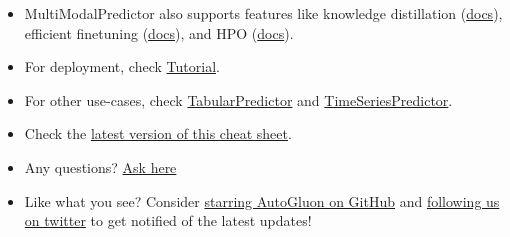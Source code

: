 \begin{itemize}
  \item MultiModalPredictor also supports features like knowledge distillation (\href{https://auto.gluon.ai/stable/tutorials/multimodal/advanced_topics/model_distillation.html}{docs}), efficient finetuning (\href{https://auto.gluon.ai/stable/tutorials/multimodal/advanced_topics/efficient_finetuning_basic.html}{docs}), and HPO (\href{https://auto.gluon.ai/stable/tutorials/multimodal/advanced_topics/hyperparameter_optimization.html}{docs}).
  \item For deployment, check \href{https://auto.gluon.ai/stable/tutorials/cloud_fit_deploy/index.html}{Tutorial}.
  \item For other use-cases, check
  \href{https://auto.gluon.ai/stable/tutorials/tabular_prediction/index.html}{TabularPredictor} and
  \href{https://auto.gluon.ai/stable/tutorials/timeseries/index.html}{TimeSeriesPredictor}.
  \item Check the \href{https://auto.gluon.ai/stable/cheatsheet.html}{latest version of this cheat sheet}.
  \item Any questions? \href{https://github.com/awslabs/autogluon/discussions}{Ask here}
  \item Like what you see? Consider \href{https://github.com/awslabs/autogluon/stargazers}{starring AutoGluon on GitHub} and \href{https://twitter.com/autogluon}{following us on twitter} to get notified of the latest updates!
\end{itemize}


\raggedcolumns


